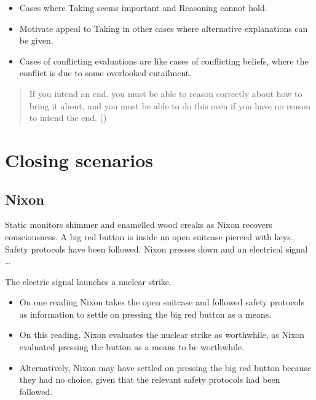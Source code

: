 \documentclass[10pt]{article}
\newcommand{\hand}{\ding{43}}
\newcommand{\hozlinedash}[0]{%
  \noindent\hdashrule[0.5ex][c]{\textwidth}{.1pt}{2.5pt}
}
\newcommand{\schemaName}[1]{\textsf{#1}}
\begin{document}
\begin{itemize}
\item[\hand] Cases where \schemaName{Taking} seems important and \schemaName{Reasoning} cannot hold.
\item Motivate appeal to \schemaName{Taking} in other cases where alternative explanations can be given.
\end{itemize}






\begin{itemize}
\item Cases of conflicting evaluations are like cases of conflicting beliefs, where the conflict is due to some overlooked entailment.
\end{itemize}



\begin{quote}
  If you intend an end, you must be able to reason correctly about how to bring it about, and you must be able to do this even if you have no reason to intend the end.\nolinebreak
  \mbox{}\hfill\mbox{(\citeyear[96]{Broome:2002aa})}
\end{quote}

\newpage

\section{Closing scenarios}
\label{sec:closing-scenarios}

\subsection{Nixon}
\label{sec:nixon}

\begin{scenario}[Nixon]
  Static monitors shimmer and enamelled wood creaks as Nixon recovers consciousness.
  A big red button is inside an open suitcase pierced with keys.
  Safety protocols have been followed.
  Nixon presses down and an electrical signal \dots
\end{scenario}

The electric signal launches a nuclear strike.

\hozlinedash

\begin{itemize}[noitemsep]
\item On one reading Nixon takes the open suitcase and followed safety protocols as information to settle on pressing the big red button as a means.
\item On this reading, Nixon evaluates the nuclear strike as worthwhile, as Nixon evaluated pressing the button as a means to be worthwhile.
\item Alternatively, Nixon may have settled on pressing the big red button because they had no choice, given that the relevant safety protocols had been followed.
\end{itemize}
\end{document}
